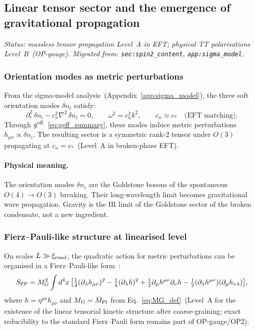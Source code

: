 \subsection{Linear tensor sector and the emergence
of gravitational propagation}
\label{sec:mp_tensor}

\textit{Status: massless tensor propagation Level~A in EFT;
physical TT polarisations Level~B~(OP-gauge).
Migrated from: \texttt{sec:spin2\_content}, \texttt{app:sigma\_model}.}

\subsubsection*{Orientation modes as metric perturbations}

From the sigma-model analysis~(Appendix~\ref{app:sigma_model}),
the three soft orientation modes $\delta n_i$ satisfy:
\begin{equation}
  \label{eq:n_eom_macro}
  \partial_t^2\,\delta n_i - c_n^2\nabla^2\,\delta n_i = 0,
  \qquad \omega^2 = c_n^2 k^2,
  \qquad c_n\approx c_*
  \quad\text{(EFT matching)}.
\end{equation}
Through $g^{\rm eff}$~\eqref{eq:geff_summary}, these modes
induce metric perturbations $h_{\mu\nu}\propto\delta n_i$.
The resulting sector is a symmetric rank-2 tensor under $O(3)$
propagating at $c_n=c_*$~(Level~A in broken-phase EFT).

\paragraph{Physical meaning.}
The orientation modes $\delta n_i$ are the Goldstone bosons
of the spontaneous $O(4)\to O(3)$ breaking.
Their long-wavelength limit becomes gravitational wave propagation.
Gravity is the IR limit of the Goldstone sector of the broken
condensate, not a new ingredient.

\subsubsection*{Fierz--Pauli-like structure at linearised level}

On scales $L\gg\xi_{\rm cond}$, the quadratic action for metric perturbations can be organised
in a Fierz--Pauli-like form~\cite{Fierz1939}:
\begin{align}
  \label{eq:FP_action}
  S_{\rm FP} = M_G^2\int d^4x\,\bigl[
    \tfrac{1}{4}(\partial_\lambda h_{\mu\nu})^2
    - \tfrac{1}{4}(\partial_\lambda h)^2
    + \tfrac{1}{2}\partial_\mu h^{\mu\nu}\partial_\nu h
    - \tfrac{1}{2}(\partial_\lambda h^{\mu\nu})(\partial_\mu h_{\nu\lambda})
  \bigr],
\end{align}
where $h=\eta^{\mu\nu}h_{\mu\nu}$ and $M_G=\bar M_{\rm Pl}$
from Eq.~\eqref{eq:MG_def}~(Level~A for the existence of the linear tensorial kinetic structure
after coarse-graining; exact reducibility to the standard
Fierz--Pauli form remains part of OP-gauge/OP2).

